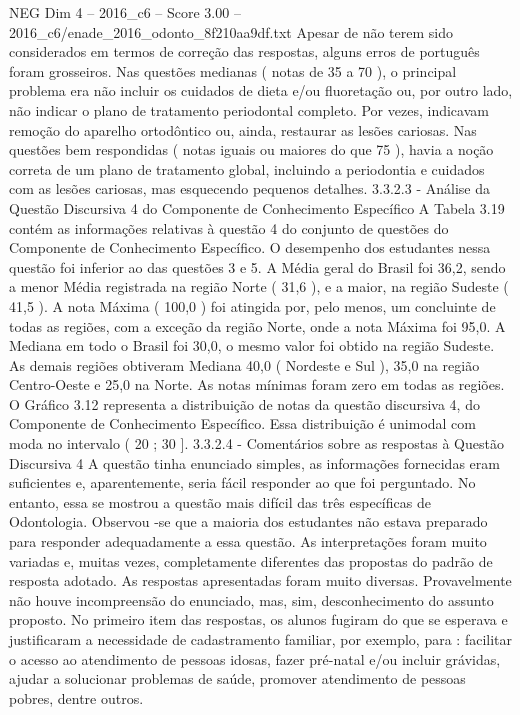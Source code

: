 \begin{textsample}{NEG Dim 4 – 2016\_c6 – Score 3.00 – 2016\_c6/enade\_2016\_odonto\_8f210aa9df.txt}
Apesar de não terem sido considerados em termos de correção das respostas, alguns erros de português foram grosseiros.
Nas questões medianas ( notas de 35 a 70 ), o principal problema era não incluir os cuidados de dieta e/ou fluoretação ou, por outro lado, não indicar o plano de tratamento periodontal completo.
Por vezes, indicavam remoção do aparelho ortodôntico ou, ainda, restaurar as lesões cariosas.
Nas questões bem respondidas ( notas iguais ou maiores do que 75 ), havia a noção correta de um plano de tratamento global, incluindo a periodontia e cuidados com as lesões cariosas, mas esquecendo pequenos detalhes. 3.3.2.3 - Análise da Questão Discursiva 4 do Componente de Conhecimento Específico A Tabela 3.19 contém as informações relativas à questão 4 do conjunto de questões do Componente de Conhecimento Específico.
O desempenho dos estudantes nessa questão foi inferior ao das questões 3 e 5.
A Média geral do Brasil foi 36,2, sendo a menor Média registrada na região Norte ( 31,6 ), e a maior, na região Sudeste ( 41,5 ).
A nota Máxima ( 100,0 ) foi atingida por, pelo menos, um concluinte de todas as regiões, com a exceção da região Norte, onde a nota Máxima foi 95,0.
A Mediana em todo o Brasil foi 30,0, o mesmo valor foi obtido na região Sudeste.
As demais regiões obtiveram Mediana 40,0 ( Nordeste e Sul ), 35,0 na região Centro-Oeste e 25,0 na Norte.
As notas mínimas foram zero em todas as regiões.
O Gráfico 3.12 representa a distribuição de notas da questão discursiva 4, do Componente de Conhecimento Específico.
Essa distribuição é unimodal com moda no intervalo ( 20 ; 30 ]. 3.3.2.4 - Comentários sobre as respostas à Questão Discursiva 4 A questão tinha enunciado simples, as informações fornecidas eram suficientes e, aparentemente, seria fácil responder ao que foi perguntado.
No entanto, essa se mostrou a questão mais difícil das três específicas de Odontologia.
Observou -se que a maioria dos estudantes não estava preparado para responder adequadamente a essa questão.
As interpretações foram muito variadas e, muitas vezes, completamente diferentes das propostas do padrão de resposta adotado.
As respostas apresentadas foram muito diversas.
Provavelmente não houve incompreensão do enunciado, mas, sim, desconhecimento do assunto proposto.
No primeiro item das respostas, os alunos fugiram do que se esperava e justificaram a necessidade de cadastramento familiar, por exemplo, para : facilitar o acesso ao atendimento de pessoas idosas, fazer pré-natal e/ou incluir grávidas, ajudar a solucionar problemas de saúde, promover atendimento de pessoas pobres, dentre outros.

\end{textsample}
